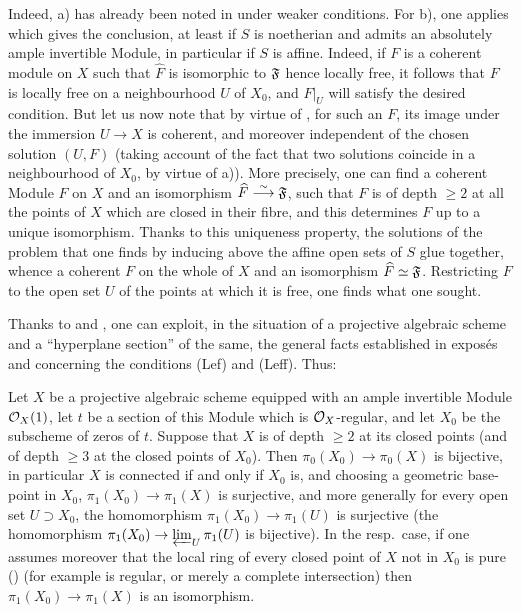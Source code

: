 Indeed, a) has already been noted in  under weaker conditions. For b), one applies  which gives the conclusion, at least if $S$ is noetherian and admits an absolutely ample invertible Module, in particular if $S$ is affine. Indeed, if $F$ is a coherent module on $X$ such that $\widehat{F}$ is isomorphic to $\mathfrak{F}$ hence locally free, it follows that $F$ is locally free on a neighbourhood $U$ of $X_0$, and $F|_U$ will satisfy the desired condition. But let us now note that by virtue of , for such an $F$, its image under the immersion $U\to X$ is coherent, and moreover independent of the chosen solution $(U, F)$ (taking account of the fact that two solutions coincide in a neighbourhood of $X_0$, by virtue of a)). More precisely, one can find a coherent Module $F$ on $X$ and an isomorphism $\widehat{F}\overset{\sim}{\longrightarrow} \mathfrak{F}$, such that $F$ is of depth $\geq 2$ at all the points of $X$ which are closed in their fibre, and this determines $F$ up to a unique isomorphism. Thanks to this uniqueness property, the solutions of the problem that one finds by inducing above the affine open sets of $S$ glue together, whence a coherent $F$ on the whole of $X$ and an isomorphism $\widehat{F}\simeq \mathfrak{F}$. Restricting $F$ to the open set $U$ of the points at which it is free, one finds what one sought.

Thanks to  and , one can exploit, in the situation of a projective algebraic scheme and a ``hyperplane section'' of the same, the general facts established in expos\'es  and  concerning the conditions (Lef) and (Leff). Thus:

\begin{corollary} \label{XII.3.5} Let $X$ be a projective algebraic scheme equipped with an ample invertible Module $\mathcal{O}_X(1)$, let $t$ be a section of this Module which is $\mathcal{O}_X$-regular, and let $X_0$ be the subscheme of zeros of $t$. Suppose that $X$ is of depth $\geq 2$ at its closed points (\resp and of depth $\geq 3$ at the closed points of $X_0$). Then $\pi_0(X_0)\to \pi_0(X)$ is bijective, in particular $X$ is connected if and only if $X_0$ is, and choosing a geometric base-point in $X_0$, $\pi_1(X_0)\to \pi_1(X)$ is surjective, and more generally for every open set $U\supset X_0$, the homomorphism $\pi_1(X_0)\to \pi_1(U)$ is surjective (\resp the homomorphism $\pi_1(X_0)\to \varprojlim_U\pi_1(U)$ is bijective). In the resp.\ case, if one assumes moreover that the local ring of every closed point of $X$ not in $X_0$ is pure () (for example is regular, or merely a complete intersection) then $\pi_1(X_0)\to \pi_1(X)$ is an isomorphism.
\end{corollary}

